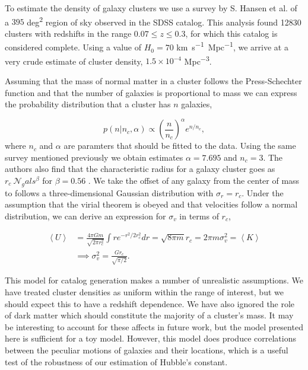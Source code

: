 To estimate the density of galaxy clusters we use a survey by S. Hansen et al. of a $395$ \si{deg^2} region of sky observed in the SDSS catalog. This analysis found 12830 clusters with redshifts in the range $0.07\leq z\leq 0.3$, for which this catalog is considered complete. Using a value of $H_0=70$ \si{km.s^{-1}.Mpc^{-1}}, we arrive at a very crude estimate of cluster density, $1.5\times 10^{-4}$ \si{Mpc^{-3}}.

Assuming that the mass of normal matter in a cluster follows the Press-Schechter function \cite{Press_1974} and that the number of galaxies is proportional to mass we can express the probability distribution that a cluster has $n$ galaxies,

\begin{equation}
p(n | n_c, \alpha) \propto \left( \frac{n}{n_c} \right)^{\alpha}e^{n/n_c},
\end{equation}
where $n_c$ and $\alpha$ are paramters that should be fitted to the data. Using the same survey mentioned previously we obtain estimates $\alpha = 7.695$ and $n_c = 3$. The authors also find that the characteristic radius for a galaxy cluster goes as $r_c ~ \mathcal{N}_gals^\beta$ for $\beta=0.56$ \cite{Hansen_2005}. We take the offset of any galaxy from the center of mass to follows a three-dimensional Gaussian distribution with $\sigma_r = r_c$. Under the assumption that the virial theorem is obeyed and that velocities follow a normal distribution, we can derive an expression for $\sigma_v$ in terms of $r_c$,

\begin{align}
  \left<U\right> &= \frac{4\pi Gm}{\sqrt{2\pi r_c^2}} \int r e^{-r^2 / 2r_c^2} dr = \sqrt{8\pi m}r_c = 2\pi m\sigma_v^2 = \left<K\right> \nonumber\\
  &\implies \sigma_v^2 = \frac{G r_c}{\sqrt{\pi/2}}.
\end{align}

This model for catalog generation makes a number of unrealistic assumptions. We have treated cluster densities as uniform within the range of interest, but we should expect this to have a redshift dependence. We have also ignored the role of dark matter which should constitute the majority of a cluster's mass. It may be interesting to account for these affects in future work, but the model presented here is sufficient for a toy model. However, this model does produce correlations between the peculiar motions of galaxies and their locations, which is a useful test of the robustness of our estimation of Hubble's constant.

